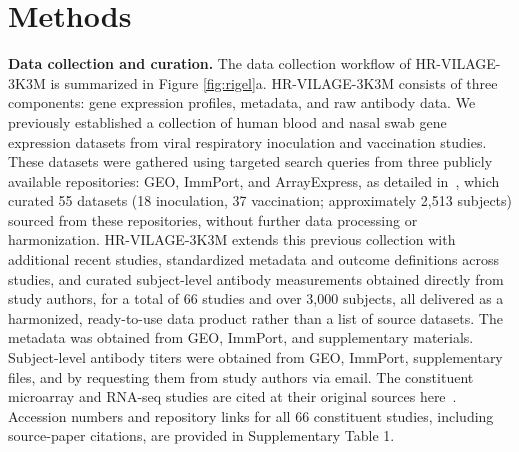 \documentclass[
  12pt]{article}
\begin{document}
\section{Methods}

\noindent\textbf{Data collection and curation.}
The data collection workflow of HR-VILAGE-3K3M is summarized in Figure \ref{fig:rigel}a. HR-VILAGE-3K3M consists of three components: gene expression profiles, metadata, and raw antibody data. We previously established a collection of human blood and nasal swab gene expression datasets from viral respiratory inoculation and vaccination studies. These datasets were gathered using targeted search queries from three publicly available repositories: GEO, ImmPort, and ArrayExpress, as detailed in~\citep{lan2024curated}, which curated 55 datasets (18 inoculation, 37 vaccination; approximately 2,513 subjects) sourced from these repositories, without further data processing or harmonization. HR-VILAGE-3K3M extends this previous collection with additional recent studies, standardized metadata and outcome definitions across studies, and curated subject-level antibody measurements obtained directly from study authors, for a total of 66 studies and over 3,000 subjects, all delivered as a harmonized, ready-to-use data product rather than a list of source datasets. The metadata was obtained from GEO, ImmPort, and supplementary materials. Subject-level antibody titers were obtained from GEO, ImmPort, supplementary files, and by requesting them from study authors via email. The constituent microarray and RNA-seq studies are cited at their original sources here~\citep{zhai2015host,sparks2023influenza,nakaya2015systems,franco2013integrative,bucasas2011early,furman2013apoptosis,furman2014systems,furman2015cytomegalovirus,avey2020seasonal,avey2017multiple,thakar2015aging,zapata2019impact,tsang2014global,rinchai2022high,furman2017expression,blazkova2017multicenter,alpert2019clinically,tomic2019fluprint,forst2022vaccination,hockman2025obese,odak2024systems,lee2022heterologous,lee2022comprehensive,lee2025rare,lee2022mrna,lee2022prior,hennighausen2026impact,ryan2023systems,arunachalam2021systems,nakaya2011systems,obermoser2013systems,henn2013high,sarin2024impaired,lindeboom2024human,proud2008gene,davenport2015transcriptomic,muller2017development,habibi2020neutrophilic,liu2016individualized,jochems2018inflammation,watanabe2023time,drury2024multi,grewe2024mva,chang2024altered,chang2024network,lucchesi2025transcriptomic,wimmers2021single,aydillo2022transcriptome,thwaites2023early,cao2014differences,narang2018influenza,monaco2019rna,carre2021endoplasmic,rinchai2025temporal}. Accession numbers and repository links for all 66 constituent studies, including source-paper citations, are provided in Supplementary Table 1.
\end{document}
